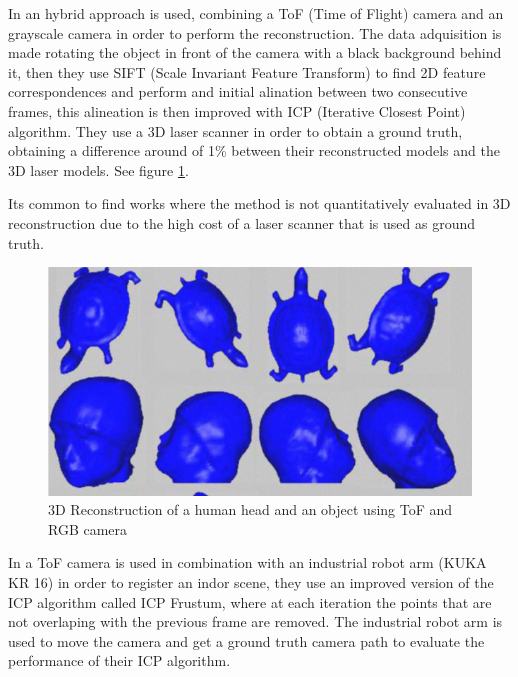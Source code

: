In \cite{guangyu} an hybrid approach is used, combining a ToF (Time of Flight) camera and an grayscale camera in order to perform the reconstruction. 
The data adquisition is made rotating the object in front of the camera with a black background behind it, then they use 
SIFT (Scale Invariant Feature Transform) to find 2D feature correspondences and perform and initial alination between two consecutive frames, this alineation is 
then improved with ICP (Iterative Closest Point) algorithm. They use a 3D laser scanner in order to obtain a ground truth, obtaining a difference around of 1\% 
between their reconstructed
 models and the 3D laser models. See figure \ref{fig:guangyu}.

Its common to find works where the method is not quantitatively evaluated 
in 3D reconstruction due to the high 
cost of a laser scanner that is used as ground truth. 


\begin{figure}[h!]
\begin{center}
\includegraphics[scale=0.38]{images/guangyu}
\caption{3D Reconstruction of a human head and an object using ToF and RGB camera}
\label{fig:guangyu}
\end{center}
\end{figure}

In \cite{may2009} a ToF camera is used in combination with an industrial robot arm (KUKA KR 16) in order to register an indor scene,
they use an improved version of the ICP algorithm called ICP Frustum, where at each iteration the points that are not overlaping with the previous frame are removed. The industrial robot arm is used to move the camera and get a ground truth camera path to evaluate the performance of their ICP algorithm. 


